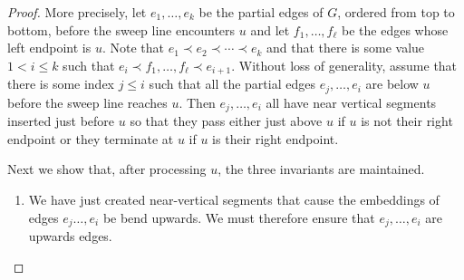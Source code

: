\documentclass[lotsofwhite]{patmorin}
\begin{document}
\begin{proof}
More precisely, let $e_1,\ldots,e_k$ be the partial edges of $G$,
ordered from top to bottom, before the sweep line encounters $u$ and
let $f_1,\ldots,f_\ell$ be the edges whose left endpoint is $u$.  Note
that $e_1\prec e_2\prec\cdots\prec e_k$ and that there is some value
$1<i\le k$ such that $e_i\prec f_1,\ldots,f_\ell\prec e_{i+1}$.
Without loss of generality, assume that there is some index $j \le i$
such that all the partial edges $e_{j},\ldots,e_i$ are below $u$
before the sweep line reaches $u$.  Then $e_j,\ldots,e_i$ all have
near vertical segments inserted just before $u$ so that they pass
either just above $u$ if $u$ is not their right endpoint or they
terminate at $u$ if $u$ is their right endpoint.

Next we show that, after processing $u$, the three invariants are
maintained.

\begin{enumerate}
\item We have just created near-vertical segments that cause the embeddings of edges
$e_j\ldots,e_i$ be bend upwards.  We must therefore ensure that
$e_j,\ldots,e_i$ are upwards edges.

\end{enumerate}
\end{proof}
\end{document}
